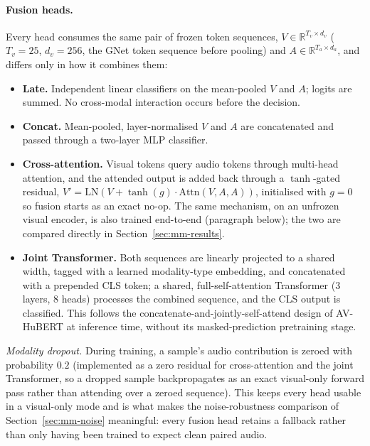 \documentclass[10pt, a4paper]{article}
\begin{document}
\paragraph{Fusion heads.} Every head consumes the same pair of frozen token sequences, $V \in \mathbb{R}^{T_v \times d_v}$ ($T_v = 25$, $d_v = 256$, the GNet token sequence before pooling) and $A \in \mathbb{R}^{T_a \times d_a}$, and differs only in how it combines them:
\begin{itemize}[leftmargin=1.4em, itemsep=2pt]
    \item \textbf{Late.} Independent linear classifiers on the mean-pooled $V$ and $A$; logits are summed. No cross-modal interaction occurs before the decision.
    \item \textbf{Concat.} Mean-pooled, layer-normalised $V$ and $A$ are concatenated and passed through a two-layer MLP classifier.
    \item \textbf{Cross-attention.} Visual tokens query audio tokens through multi-head attention, and the attended output is added back through a $\tanh$-gated residual, $V' = \mathrm{LN}(V + \tanh(g)\cdot\mathrm{Attn}(V, A, A))$, initialised with $g=0$ so fusion starts as an exact no-op. The same mechanism, on an unfrozen visual encoder, is also trained end-to-end (paragraph below); the two are compared directly in Section~\ref{sec:mm-results}.
    \item \textbf{Joint Transformer.} Both sequences are linearly projected to a shared width, tagged with a learned modality-type embedding, and concatenated with a prepended CLS token; a shared, full-self-attention Transformer ($3$ layers, $8$ heads) processes the combined sequence, and the CLS output is classified. This follows the concatenate-and-jointly-self-attend design of AV-HuBERT \citep{shi2022avhubert} at inference time, without its masked-prediction pretraining stage.
\end{itemize}
\emph{Modality dropout.} During training, a sample's audio contribution is zeroed with probability $0.2$ (implemented as a zero residual for cross-attention and the joint Transformer, so a dropped sample backpropagates as an exact visual-only forward pass rather than attending over a zeroed sequence). This keeps every head usable in a visual-only mode and is what makes the noise-robustness comparison of Section~\ref{sec:mm-noise} meaningful: every fusion head retains a fallback rather than only having been trained to expect clean paired audio.
\end{document}
